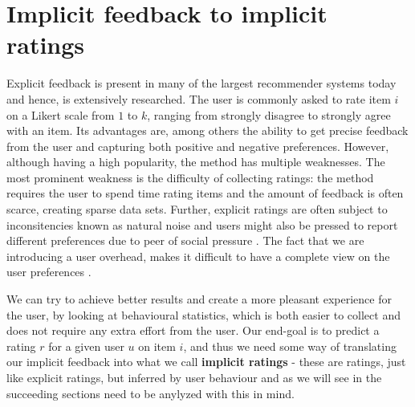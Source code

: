 




\section{Implicit feedback to implicit ratings}


Explicit feedback is present in many of the largest recommender systems today
and hence, is extensively researched. The user is commonly asked to
rate item $i$ on a Likert scale from $1$ to $k$, ranging from strongly
disagree to strongly agree with an item. Its advantages are, among others the
ability to get precise feedback from the user and capturing both positive and
negative preferences. However, although having a high popularity, the method
has multiple weaknesses. The most prominent weakness is the difficulty of
collecting ratings: the method requires the user to spend time rating items and
the amount of feedback is often scarce, creating sparse data sets. Further,
explicit ratings are often subject to inconsitencies known as natural
noise \cite{amatriain2009like} and users might also be pressed to report
different preferences due to peer of social pressure . The fact that we are
introducing a user overhead, makes it difficult to have a complete view on the
user preferences \cite{jawaheer2010characterisation}.

We can try to achieve better results and create a more pleasant experience for
the user, by looking at behavioural statistics, which is both easier to collect
and does not require any extra effort from the user. Our end-goal is to predict
a rating $r$ for a given user $u$ on item $i$, and thus we need some way of
translating our implicit feedback into what we call \textbf{implicit ratings} -
these are ratings, just like explicit ratings, but inferred by user behaviour
and as we will see in the succeeding sections need to be anylyzed with this in
mind.

